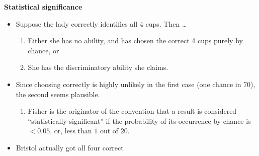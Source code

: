 \documentclass[notes=show]{beamer}
\begin{document}

\begin{frame}[plain]

	\begin{center}
	\textbf{Statistical significance}
	\end{center}
	
	\begin{itemize}
	\item Suppose the lady correctly identifies all 4 cups.  Then \dots
		\begin{enumerate}
		\item Either she has no ability, and has chosen the correct 4 cups purely by chance, or
		\item She has the discriminatory ability she claims.
		\end{enumerate}
	\item Since choosing correctly is highly unlikely in the first case (one chance in $70$), the second seems plausible.
		\begin{enumerate}
		\item Fisher is the originator of the convention that a result is considered ``statistically significant'' if the probability of its occurrence by chance is $<0.05$, or, less than $1$ out of $20$.
		\end{enumerate}
	\item Bristol actually got all four correct
	\end{itemize}
\end{frame}
\end{document}
